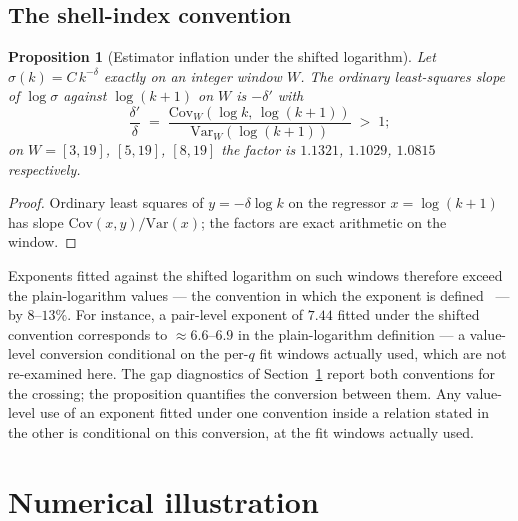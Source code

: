 \documentclass[11pt,a4paper]{article}
\newtheorem{proposition}[theorem]{Proposition}
\theoremstyle{definition}
\begin{document}
\subsection{The shell-index convention}
\label{ssec:estimator}

\begin{proposition}[Estimator inflation under the shifted logarithm]
  \label{prop:estimator}
  Let $\sigma(k) = C\, k^{-\delta}$ exactly on an integer window $W$.
  The ordinary least-squares slope of $\log \sigma$ against $\log(k+1)$ on $W$ is $-\delta'$ with
  \[
    \frac{\delta'}{\delta}
    \;=\; \frac{\mathrm{Cov}_W\!\left(\log k,\, \log(k+1)\right)}{\mathrm{Var}_W\!\left(\log(k+1)\right)}
    \;>\; 1 ;
  \]
  on $W = [3,19]$, $[5,19]$, $[8,19]$ the factor is $1.1321$, $1.1029$, $1.0815$ respectively.
\end{proposition}

\begin{proof}
  Ordinary least squares of $y = -\delta \log k$ on the regressor $x = \log(k+1)$ has slope
  $\mathrm{Cov}(x,y)/\mathrm{Var}(x)$; the factors are exact arithmetic on the window.
\end{proof}

Exponents fitted against the shifted logarithm on such windows therefore exceed the plain-logarithm
values --- the convention in which the exponent is defined~\cite{Beau2026a20} --- by $8$--$13\%$.
For instance, a pair-level exponent of $7.44$ fitted under the shifted convention corresponds to
$\approx 6.6$--$6.9$ in the plain-logarithm definition --- a value-level conversion conditional on the
per-$q$ fit windows actually used, which are not re-examined here.
The gap diagnostics of Section~\ref{sec:numerics} report both conventions for the crossing; the
proposition quantifies the conversion between them.
Any value-level use of an exponent fitted under one convention inside a relation stated in the other is
conditional on this conversion, at the fit windows actually used.

\section{Numerical illustration}
\label{sec:numerics}
\end{document}
